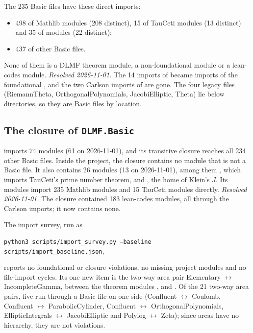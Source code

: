 \documentclass[11pt,a4paper]{article}
\newcommand{\resolved}[1]{\textit{Resolved #1.}}
\begin{document}
The 235 Basic files have these direct imports:

\begin{itemize}
  \item 498 of Mathlib modules (208 distinct), 15 of TauCeti modules (13 distinct) and 35 of
     modules (22 distinct);
  \item 437 of other Basic files.
\end{itemize}

None of them is a DLMF theorem module, a non-foundational  module or a
lean-codes module. \resolved{2026-11-01} The 14 imports of  became
imports of the foundational , and the two Carlson imports of
 are gone. The four legacy files
 (RiemannTheta, OrthogonalPolynomials, JacobiElliptic, Theta) lie below
 directories, so they are Basic files by location.

\subsection{The closure of \texorpdfstring{\texttt{DLMF.Basic}}{DLMF.Basic}}

 imports 74 modules (61 on 2026-11-01), and its transitive closure reaches
all 234 other Basic files. Inside the project, the closure contains no module that is not a
Basic file. It also contains 26  modules (13 on 2026-11-01), among them
, which imports TauCeti's prime number
theorem, and , the home of
Klein's \(J\). Its modules import 235 Mathlib modules and 15 TauCeti modules directly.
\resolved{2026-11-01} The closure contained 183 lean-codes modules, all through the Carlson
imports; it now contains none.

The import survey, run as
\begin{center}
  \texttt{python3 scripts/import\_survey.py --baseline scripts/import\_baseline.json},
\end{center}
reports no foundational or closure violations, no missing project modules and no file-import
cycles. Its one new item is the two-way area pair Elementary \(\leftrightarrow\)
IncompleteGamma, between the theorem modules ,
 and . Of the 21 two-way
area pairs, five run through a Basic file on one side (Confluent \(\leftrightarrow\) Coulomb,
Confluent \(\leftrightarrow\) ParabolicCylinder, Confluent \(\leftrightarrow\)
OrthogonalPolynomials, EllipticIntegrals \(\leftrightarrow\) JacobiElliptic and Polylog
\(\leftrightarrow\) Zeta); since areas have no hierarchy, they are not violations.
\end{document}
